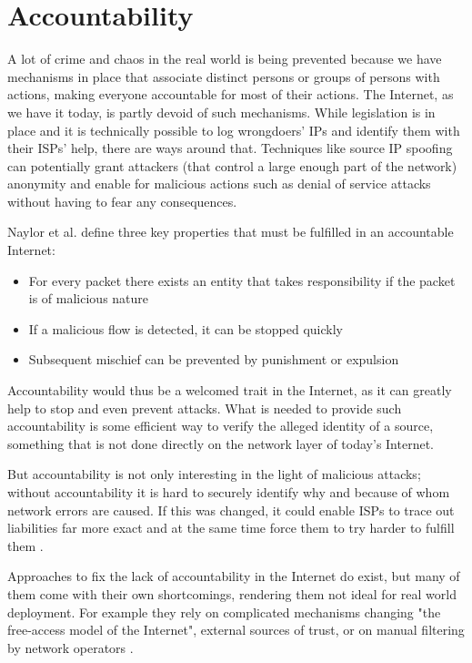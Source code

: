 \documentclass{acm_proc_article-sp}
\begin{document}

\section{Accountability}
\label{sec:acc}
A lot of crime and chaos in the real world is being prevented because we have mechanisms in place that associate distinct persons or groups of persons with actions, making everyone accountable for most of their actions. The Internet, as we have it today, is partly devoid of such mechanisms. While legislation is in place and it is technically possible to log wrongdoers' IPs and identify them with their ISPs' help, there are ways around that. Techniques like source IP spoofing can potentially grant attackers (that control a large enough part of the network) anonymity and enable for malicious actions such as denial of service attacks without having to fear any consequences.

Naylor et al. \cite{apip} define three key properties that must be fulfilled in an accountable Internet:

\begin{itemize}
\item For every packet there exists an entity that takes responsibility if the packet is of malicious nature
\item If a malicious flow is detected, it can be stopped quickly
\item Subsequent mischief can be prevented by punishment or expulsion
\end{itemize}

Accountability would thus be a welcomed trait in the Internet, as it can greatly help to stop and even prevent attacks. What is needed to provide such accountability is some efficient way to verify the alleged identity of a source, something that is not done directly on the network layer of today's Internet. 

But accountability is not only interesting in the light of malicious attacks; without accountability it is hard to securely identify why and because of whom network errors are caused. If this was changed, it could enable ISPs to trace out liabilities far more exact and at the same time force them to try harder to fulfill them \cite{mot}. 

Approaches to fix the lack of accountability in the Internet do exist, but many of them come with their own shortcomings, rendering them not ideal for real world deployment. For example they rely on complicated mechanisms changing "the free-access model of the Internet", external sources of trust, or on manual filtering by network operators \cite{aip}.
\end{document}
